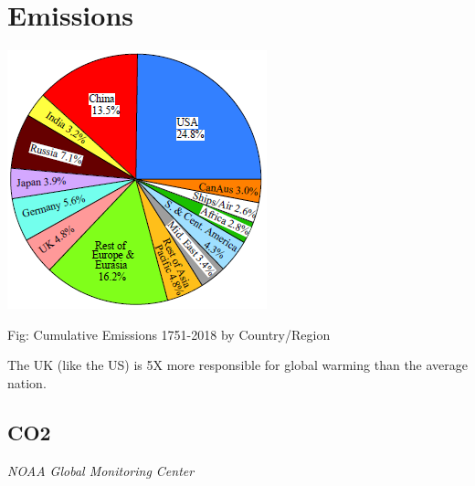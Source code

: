 \documentclass[
]{book}
\begin{document}
\hypertarget{emissions}{%
\section{Emissions}\label{emissions}}

\includegraphics{fig/Emissions_Sum_1751-2018_by_Region.png}

Fig: Cumulative Emissions 1751-2018 by Country/Region

The UK (like the US) is 5X more responsible for global warming than the average nation.

\hypertarget{co2}{%
\subsection{CO2}\label{co2}}

\emph{NOAA Global Monitoring Center}
\end{document}
